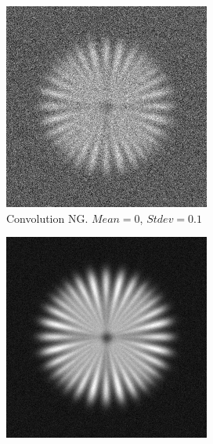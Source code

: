 \documentclass{./packages/optica-article}
\begin{document}
\begin{figure}[hbp]
\begin{center}
\begin{subfigure}[t]{0.25\textwidth}
			\includegraphics[width=\textwidth]{Simulation deconvolution/ref_ng_0.1}
			\caption{Convolution NG. $Mean=0$, $Stdev=0.1$}\label{fig:sim:ng0.1}
		\end{subfigure}
		\hfill
		\begin{subfigure}[t]{0.25\textwidth}\centering
			\centering
			\includegraphics[width=\textwidth]{Simulation deconvolution/ref_ng_0.01}

\end{subfigure}
\end{center}
\end{figure}
\end{document}
